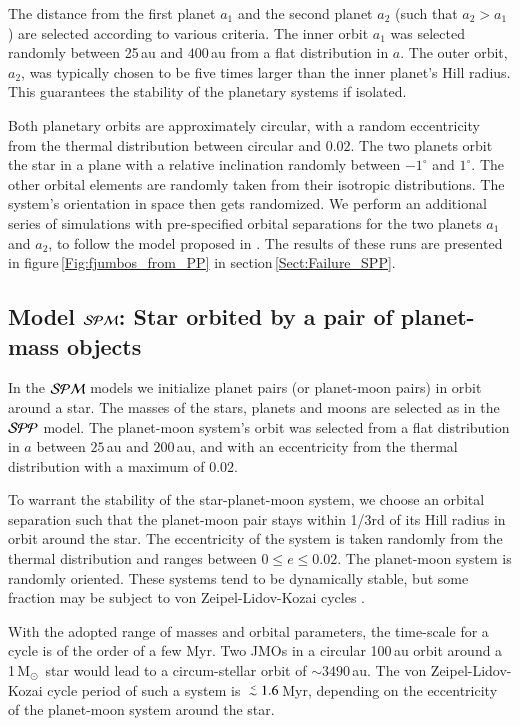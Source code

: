 \documentclass[submission,phys]{lib/SciPost}
\newcommand{\MSun}{\mbox{$\mathrm{{M}}_\odot$}}
\def\aplt{\ {\raise-.5ex\hbox{$\buildrel<\over\sim$}}\ }
\begin{document}
The distance from the first
planet $a_1$ and the second planet $a_2$ (such that $a_2>a_1$) are
selected according to various criteria.  The inner orbit $a_1$ was
selected randomly between 25\,au and $400$\,au from a flat
distribution in $a$.  The outer orbit, $a_2$, was typically chosen to
be five times larger than the inner planet's Hill radius.  This
guarantees the stability of the planetary systems if isolated.

Both planetary orbits are approximately circular, with a random eccentricity
from the thermal distribution between circular and $0.02$.  The two
planets orbit the star in a plane with a relative inclination randomly
between $-1^\circ$ and $1^\circ$. The other orbital elements are
randomly taken from their isotropic distributions.  The system's orientation 
in space then gets randomized.  We perform an
additional series of simulations with pre-specified orbital
separations for the two planets $a_1$ and $a_2$, to follow the model
proposed in \cite{2023arXiv231006016W}. The results of these runs are
presented in figure\,\ref{Fig:fjumbos_from_PP} in
section\,\ref{Sect:Failure_SPP}.

\subsection{Model ${\cal SPM}$: Star orbited by a pair of planet-mass objects}

In the ${\cal SPM}$ models we initialize planet pairs (or planet-moon
pairs) in orbit around a star. The masses of the stars, planets and
moons are selected as in the ${\cal SPP}$ model.  The planet-moon
system's orbit was selected from a flat distribution in $a$ between
$25$\,au and $200$\,au, and with an eccentricity from the thermal
distribution with a maximum of $0.02$.

To warrant the stability of the star-planet-moon system, we choose an
orbital separation such that the planet-moon pair stays within 1/3rd
of its Hill radius in orbit around the star. The eccentricity of the
system is taken randomly from the thermal distribution and ranges between 
$0\leq e\leq 0.02$.  The planet-moon system is randomly oriented.  These
systems tend to be dynamically stable, but some fraction may be
subject to von Zeipel-Lidov-Kozai cycles
\cite{1910AN....183..345V,1962PSS..9..719L,1962AJ.....67..591K}.  

With the adopted range of masses and orbital parameters, the
time-scale for a cycle is of the order of a few Myr.  Two JMOs in a
circular 100\,au orbit around a 1\,\MSun\, star would lead to a
circum-stellar orbit of $\sim 3490$\,au. The von Zeipel-Lidov-Kozai
cycle period of such a system is $\aplt 1.6$\,Myr, depending on the
eccentricity of the planet-moon system around the star.
\end{document}
